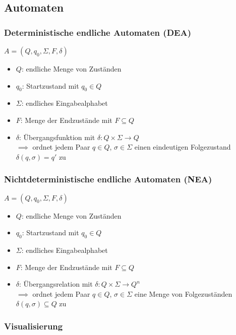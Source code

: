 \documentclass{article}
\begin{document}
	\subsection{Automaten}
	
	\subsubsection{Deterministische endliche Automaten (DEA)}
	
	$A = (Q, q_0, \Sigma, F, \delta)$
	\begin{itemize}
		\item $Q$: endliche Menge von Zuständen
		\item $q_0$: Startzustand mit $q_0 \in Q$
		\item $\Sigma$: endliches Eingabealphabet
		\item $F$: Menge der Endzustände mit $F \subseteq Q$
		\item $\delta$: Übergangsfunktion mit $\delta: Q \times \Sigma \rightarrow Q$ \\
		$\implies$ ordnet jedem Paar $q \in Q$, $\sigma \in \Sigma$ einen eindeutigen Folgezustand $\delta(q,\sigma) = q'$ zu
	\end{itemize}
	
	\subsubsection{Nichtdeterministische endliche Automaten (NEA)}
	
	$A = (Q, q_0, \Sigma, F, \delta)$
	\begin{itemize}
		\item $Q$: endliche Menge von Zuständen
		\item $q_0$: Startzustand mit $q_0 \in Q$
		\item $\Sigma$: endliches Eingabealphabet
		\item $F$: Menge der Endzustände mit $F \subseteq Q$
		\item $\delta$: Übergangsrelation mit $\delta: Q \times \Sigma \rightarrow Q^n$ \\
		$\implies$ ordnet jedem Paar $q \in Q$, $\sigma \in \Sigma$ eine Menge von Folgezuständen $\delta(q,\sigma) \subseteq Q$ zu
	\end{itemize}
	
	\subsubsection{Visualisierung}
	
\end{document}
